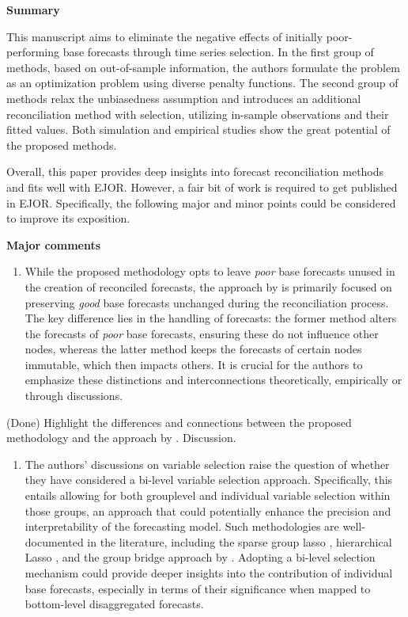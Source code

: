 \documentclass[11pt,a4paper,]{article}
\providecommand{\tightlist}{%
  \setlength{\itemsep}{0pt}\setlength{\parskip}{0pt}}
\renewenvironment{quote}
               {\list{}{\rightmargin\leftmargin}%
                \item\relax\color[RGB]{0,150,0}}
               {\endlist}
\begin{document}
\textbf{Summary}

This manuscript aims to eliminate the negative effects of initially
poor-performing base forecasts through time series selection. In the
first group of methods, based on out-of-sample information, the authors
formulate the problem as an optimization problem using diverse penalty
functions. The second group of methods relax the unbiasedness assumption
and introduces an additional reconciliation method with selection,
utilizing in-sample observations and their fitted values. Both
simulation and empirical studies show the great potential of the
proposed methods.

Overall, this paper provides deep insights into forecast reconciliation
methods and fits well with EJOR. However, a fair bit of work is required
to get published in EJOR. Specifically, the following major and minor
points could be considered to improve its exposition.

\textbf{Major comments}

\begin{enumerate}
\def\labelenumi{\arabic{enumi}.}
\tightlist
\item
  While the proposed methodology opts to leave \emph{poor} base
  forecasts unused in the creation of reconciled forecasts, the approach
  by \textcite{Zhang2023-op} is primarily focused on preserving
  \emph{good} base forecasts unchanged during the reconciliation
  process. The key difference lies in the handling of forecasts: the
  former method alters the forecasts of \emph{poor} base forecasts,
  ensuring these do not influence other nodes, whereas the latter method
  keeps the forecasts of certain nodes immutable, which then impacts
  others. It is crucial for the authors to emphasize these distinctions
  and interconnections theoretically, empirically or through
  discussions.
\end{enumerate}

\begin{quote}
(Done) Highlight the differences and connections between the proposed
methodology and the approach by \textcite{Zhang2023-op}. Discussion.
\end{quote}

\begin{enumerate}
\def\labelenumi{\arabic{enumi}.}
\setcounter{enumi}{1}
\tightlist
\item
  The authors' discussions on variable selection raise the question of
  whether they have considered a bi-level variable selection approach.
  Specifically, this entails allowing for both grouplevel and individual
  variable selection within those groups, an approach that could
  potentially enhance the precision and interpretability of the
  forecasting model. Such methodologies are well-documented in the
  literature, including the sparse group lasso \autocite{Simon2013-sp},
  hierarchical Lasso \autocite{Zhou2010-vs}, and the group bridge
  approach by \textcite{Huang2009-vs}. Adopting a bi-level selection
  mechanism could provide deeper insights into the contribution of
  individual base forecasts, especially in terms of their significance
  when mapped to bottom-level disaggregated forecasts.
\end{enumerate}
\end{document}
